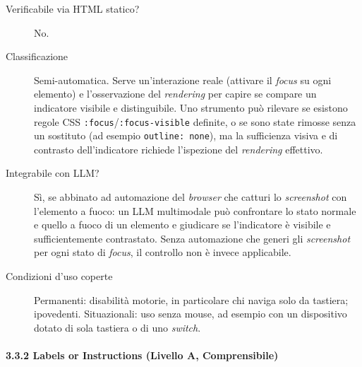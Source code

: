 \begin{description}

\item[Verificabile via HTML statico?] No.
\item[Classificazione] Semi-automatica. Serve un'interazione reale (attivare il \emph{focus} su ogni elemento) e l'osservazione del \emph{rendering} per capire se compare un indicatore visibile e distinguibile. Uno strumento può rilevare se esistono regole CSS \texttt{:focus}/\texttt{:focus-visible} definite, o se sono state rimosse senza un sostituto (ad esempio \texttt{outline: none}), ma la sufficienza visiva e di contrasto dell'indicatore richiede l'ispezione del \emph{rendering} effettivo.
\item[Integrabile con LLM?] Sì, se abbinato ad automazione del \emph{browser} che catturi lo \emph{screenshot} con l'elemento a fuoco: un LLM multimodale può confrontare lo stato normale e quello a fuoco di un elemento e giudicare se l'indicatore è visibile e sufficientemente contrastato. Senza automazione che generi gli \emph{screenshot} per ogni stato di \emph{focus}, il controllo non è invece applicabile.

\item[Condizioni d'uso coperte] Permanenti: disabilità motorie, in particolare chi naviga solo da tastiera; ipovedenti. Situazionali: uso senza mouse, ad esempio con un dispositivo dotato di sola tastiera o di uno \emph{switch}.

\end{description}

\paragraph*{3.3.2 Labels or Instructions (Livello A, Comprensibile)}

